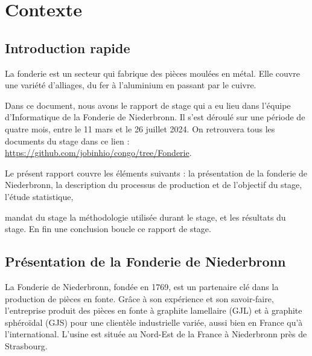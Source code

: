 \documentclass[12pt]{article}
\begin{document}
\newpage

\tableofcontents

\newpage


    




\section{Contexte }


\subsection{Introduction rapide}



La fonderie est un secteur qui fabrique des pièces moulées en métal. 
Elle couvre une variété d’alliages, du fer à l’aluminium en passant 
par le cuivre.

Dans ce document, nous avons le rapport de stage qui a eu lieu dans l'équipe
d'Informatique de la Fonderie de Niederbronn. Il s'est déroulé sur
une période de quatre mois, entre le 11 mars et le 26 juillet 2024. 
On retrouvera tous les documents du stage dans ce 
lien : \url{https://github.com/jobinhio/congo/tree/Fonderie}. 


Le présent rapport couvre les éléments suivants : la présentation de 
la fonderie de Niederbronn, la description du processus 
de production et de l'objectif du stage, l'étude statistique,  

mandat du stage la méthodologie utilisée durant le stage, et les résultats du stage. En
fin une conclusion boucle ce rapport de stage.


\subsection{Présentation de la Fonderie de Niederbronn}


La Fonderie de Niederbronn, fondée en 1769, est un partenaire clé dans la production de pièces 
en fonte. Grâce à son expérience et son savoir-faire, l'entreprise produit des pièces en fonte 
à graphite lamellaire (GJL) et à graphite sphéroïdal (GJS) pour une clientèle industrielle variée,
aussi bien en France qu'à l'international. L’usine est située au Nord-Est de la France 
à Niederbronn près de Strasbourg.
\end{document}
